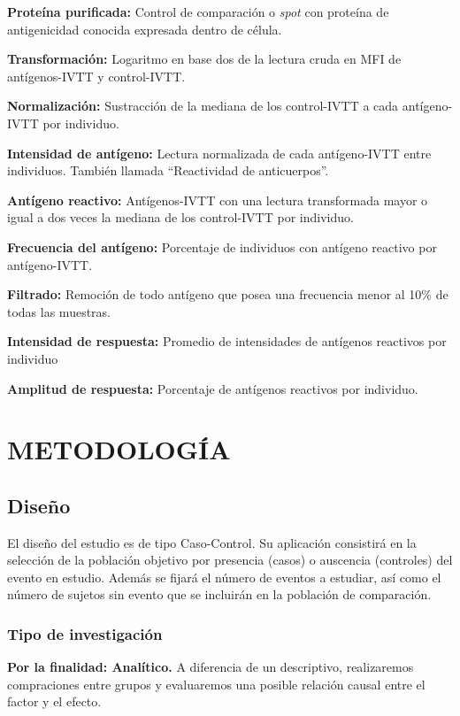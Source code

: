 \documentclass[]{article}
\begin{document}
\textbf{Proteína purificada:} Control de comparación o \emph{spot} con
proteína de antigenicidad conocida expresada dentro de célula.

\textbf{Transformación:} Logaritmo en base dos de la lectura cruda en
MFI de antígenos-IVTT y control-IVTT.

\textbf{Normalización:} Sustracción de la mediana de los control-IVTT a
cada antígeno-IVTT por individuo.

\textbf{Intensidad de antígeno:} Lectura normalizada de cada
antígeno-IVTT entre individuos. También llamada ``Reactividad de
anticuerpos''.

\textbf{Antígeno reactivo:} Antígenos-IVTT con una lectura transformada
mayor o igual a dos veces la mediana de los control-IVTT por individuo.

\textbf{Frecuencia del antígeno:} Porcentaje de individuos con antígeno
reactivo por antígeno-IVTT.

\textbf{Filtrado:} Remoción de todo antígeno que posea una frecuencia
menor al 10\% de todas las muestras.

\textbf{Intensidad de respuesta:} Promedio de intensidades de antígenos
reactivos por individuo

\textbf{Amplitud de respuesta:} Porcentaje de antígenos reactivos por
individuo.

\section{METODOLOGÍA}\label{metodologia}

\subsection{Diseño}\label{diseno}

El diseño del estudio es de tipo Caso-Control. Su aplicación consistirá
en la selección de la población objetivo por presencia (casos) o
auscencia (controles) del evento en estudio. Además se fijará el número
de eventos a estudiar, así como el número de sujetos sin evento que se
incluirán en la población de comparación.

\subsubsection{Tipo de investigación}\label{tipo-de-investigacion}

\textbf{Por la finalidad: Analítico.} A diferencia de un descriptivo,
realizaremos compraciones entre grupos y evaluaremos una posible
relación causal entre el factor y el efecto.
\end{document}
